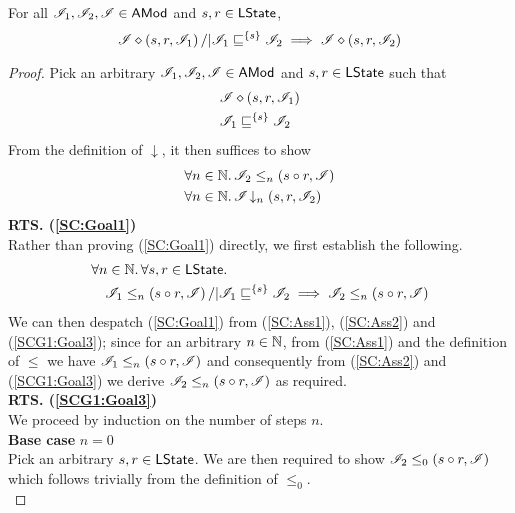 %
%
%
\begin{lemma}\label{lem:shift-closure}
%
For all $\mathscr{I}_1, \mathscr{I}_2, \mathscr{I} \in \textsf{AMod}$ and $s, r \in \textsf{LState}$,
%
\[
	\mathscr{I} \diamond \left(s, r, \mathscr{I}_1\right) /| \mathscr{I}_1 \sqsubseteq^{\{s\}} \mathscr{I}_2 \implies \mathscr{I} \diamond \left(s, r, \mathscr{I}_2\right)
\]
%
\begin{proof} Pick an arbitrary $\mathscr{I}_1, \mathscr{I}_2, \mathscr{I} \in \textsf{AMod}$ and $s, r \in \textsf{LState}$ such that 
%
\begin{align}
	& \mathscr{I} \diamond \left(s, r, \mathscr{I}_1\right) \label{SC:Ass1}\\
	& \mathscr{I}_1 \sqsubseteq^{\{s\}} \mathscr{I}_2 \label{SC:Ass2}
\end{align} 
%
From the definition of $\downarrow$, it then suffices to show
%
\begin{align}
	& \forall n \in \mathbb{N}.\,  \mathscr{I}_2 \leq_{n}\left(s \circ r, \mathscr{I}\right) \label{SC:Goal1}\\
	& \forall n \in \mathbb{N}.\,  \mathscr{I} \!\downarrow_{n} \left(s, r, \mathscr{I}_2\right) \label{SC:Goal2}
\end{align}
%
\noindent\textbf{RTS. (\ref{SC:Goal1})} \\
Rather than proving (\ref{SC:Goal1}) directly, we first establish the following.
%
\begin{align}
	& \forall n \in \mathbb{N}.\, \forall s, r \in \textsf{LState}.\, \nonumber\\
	& \quad \mathscr{I}_1 \leq_{n}\left(s \circ r, \mathscr{I}\right) /| \mathscr{I}_1 \sqsubseteq^{\{s\}} \mathscr{I}_2 \implies \mathscr{I}_2 \leq_{n}\left(s \circ r, \mathscr{I}\right) \label{SCG1:Goal3}
\end{align}
%
We can then despatch (\ref{SC:Goal1}) from (\ref{SC:Ass1}), (\ref{SC:Ass2}) and (\ref{SCG1:Goal3}); since for an arbitrary $n \in \mathbb{N}$, from (\ref{SC:Ass1}) and the definition of $\leq$ we have $\mathscr{I}_1 \leq_{n}\left(s \circ r, \mathscr{I}\right)$ and consequently from (\ref{SC:Ass2}) and (\ref{SCG1:Goal3}) we derive $\mathscr{I}_2 \leq_{n}\left(s \circ r, \mathscr{I}\right) $ as required. \\

\noindent\textbf{RTS. (\ref{SCG1:Goal3})} \\
We proceed by induction on the number of steps $n$.\\

\noindent\textbf{Base case }$n=0$\\
Pick an arbitrary $s, r \in \textsf{LState}$. We are then required to show	$\mathscr{I}_2 \leq_{0}\left(s \circ r, \mathscr{I}\right) $ which follows trivially from the definition of $\leq_0$.\\



\end{proof}
\end{lemma}
